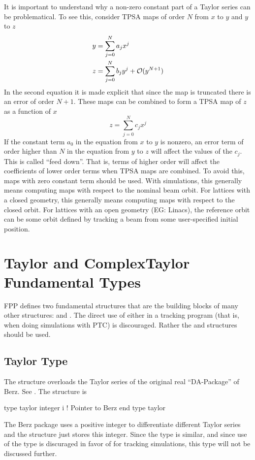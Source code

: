 \documentclass{hitec}     %
\newcommand{\Section}[1]{\section{#1}\vspace*{-1ex}}
\begin{document}
It is important to understand why a non-zero constant part of a Taylor series can be
problematical. To see this, consider TPSA maps of order $N$ from $x$ to $y$ and $y$ to $z$
\begin{align}
  y &= \sum_{j = 0}^N a_j x^j \\
  z &= \sum_{j = 0}^N b_j y^j + {\cal O}(y^{N+1}) \nonumber
\end{align}
In the second equation it is made explicit that since the map is truncated there is an error of
order $N+1$. These maps can be combined to form a TPSA map of $z$ as a function of $x$ 
\begin{equation}
  z = \sum_{j = 0}^N c_j x^j
\end{equation}
If the constant term $a_0$ in the equation from $x$ to $y$ is nonzero, an error term of order higher
than $N$ in the equation from $y$ to $z$ will affect the values of the $c_j$. This is called ``feed
down''. That is, terms of higher order will affect the coefficients of lower order terms when TPSA
maps are combined. To avoid this, maps with zero constant term should be used. With simulations,
this generally means computing maps with respect to the nominal beam orbit. For lattices with a
closed geometry, this generally means computing maps with respect to the closed orbit. For lattices
with an open geometry (EG: Linacs), the reference orbit can be some orbit defined by tracking a beam
from some user-specified initial position.

\Section{Taylor and ComplexTaylor Fundamental Types}
\label{s:fundamental}

FPP defines two fundamental structures that are the building blocks of many other structures:  and
. The direct use of either in a tracking program (that is, when doing simulations with PTC) is
discouraged. Rather the  and  structures should be used.

\subsection{Taylor Type}
\label{s:taylor}

The  structure overloads the Taylor series of the original real ``DA-Package'' of
Berz. See . The structure is
\begin{code}
type taylor
   integer i    ! Pointer to Berz
end type taylor
\end{code}
The Berz package uses a positive integer to differentiate different Taylor series and the
 structure just stores this integer. Since the  type is similar, and since use
of the  type is discuraged in favor of  for tracking simulations, this type will not
be discussed further.
\end{document}
